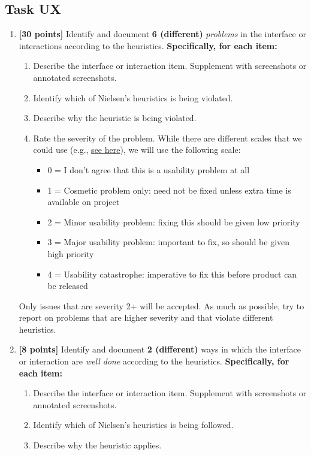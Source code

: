 \documentclass{article}
\begin{document}
\subsection{Task UX}
\begin{enumerate}
    \item \textbf{[30 points]} Identify and document \textbf{6 (different)} \textit{problems} in the interface or interactions according to the heuristics.
    \textbf{Specifically, for each item:}
    \begin{enumerate}
        \item Describe the interface or interaction item. Supplement with screenshots or annotated screenshots.
        \item Identify which of Nielsen's heuristics is being violated.
        \item Describe why the heuristic is being violated.
        \item Rate the severity of the problem. While there are different scales that we could use (e.g., \href{https://measuringu.com/rating-severity/}{see here}), we will use the following scale:
        \begin{itemize}
            \item 0 = I don’t agree that this is a usability problem at all
            \item 1 = Cosmetic problem only: need not be fixed unless extra time is available on project
            \item 2 = Minor usability problem: fixing this should be given low priority
            \item 3 = Major usability problem: important to fix, so should be given high priority
            \item 4 = Usability catastrophe: imperative to fix this before product can be released
        \end{itemize}
    \end{enumerate}
    Only issues that are severity 2+ will be accepted. As much as possible, try to report on problems that are higher severity and that violate different heuristics.
    
    \item \textbf{[8 points]} Identify and document \textbf{2 (different)} ways in which the interface or interaction are \textit{well done} according to the heuristics. \textbf{Specifically, for each item:}
    \begin{enumerate}
        \item Describe the interface or interaction item. Supplement with screenshots or annotated screenshots.
        \item Identify which of Nielsen's heuristics is being followed.
        \item Describe why the heuristic applies.
    \end{enumerate}


\end{enumerate}
\end{document}
